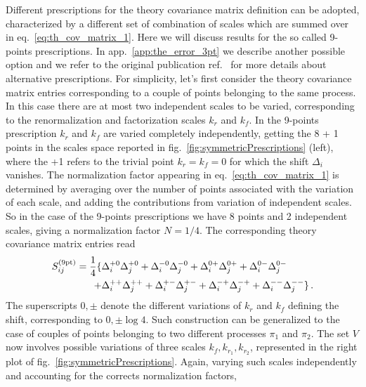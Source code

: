 %
Different prescriptions for the theory covariance matrix definition can be adopted, characterized by a different
set of combination of scales which are summed over in eq.~\eqref{eq:th_cov_matrix_1}.
Here we will discuss results for the so called 9-points prescriptions. In app.~\ref{app:the_error_3pt}
we describe another possible option and we refer to the original publication 
ref.~\cite{AbdulKhalek:2020jut} for more details about alternative prescriptions.
For simplicity, let's first consider the theory covariance matrix entries corresponding to 
a couple of points belonging to the same process. In this case there are at most two independent scales to be varied,
corresponding to the renormalization and factorization scales $k_r$ and $k_f$.
In the 9-points prescription $k_r$ and $k_f$ are varied completely independently, getting the 8 + 1 points in the 
scales space reported in fig.~\ref{fig:symmetricPrescriptions} (left), where the +1 refers to the trivial 
point $k_r=k_f=0$ for which the shift $\Delta_i$ vanishes.
The normalization factor appearing in eq.~\eqref{eq:th_cov_matrix_1}
is determined by averaging over the number of points associated with the variation of each scale,
and adding the contributions from variation of independent scales.
So in the case of the 9-points prescriptions we have 8 points and 2 independent scales, 
giving a normalization factor $N=1/4$. The corresponding theory covariance matrix entries read
\begin{equation}
    \label{9S}
    \begin{split}
        S^{(\rm 9pt)}_{ij} = \frac{1}{4}\{ &\Delta_i^{+0} \Delta_j^{+0} + \Delta_i^{-0}\Delta_j^{-0}
                                + \Delta_i^{0+} \Delta_j^{0+} + \Delta_i^{0-}\Delta_j^{0-} \\
                                + &\Delta_i^{++}\Delta_j^{++} + \Delta_i^{+-} \Delta_j^{+-}
                                + \Delta_i^{-+}\Delta_j^{-+} + \Delta_i^{--} \Delta_j^{--} \} \,.
    \end{split}                            
\end{equation}
The superscripts $0,\pm$ denote the different variations of $k_r$ and $k_f$ defining the shift,
corresponding to $ 0,\pm \log4$. 
Such construction can be generalized to the case of couples of
points belonging to two different processes $\pi_1$ and $\pi_2$. The set $V$ now involves 
possible variations of three scales $k_f,k_{r_1}, k_{r_2}$, represented in the right plot 
of fig.~\ref{fig:symmetricPrescriptions}.
Again, varying such scales independently and accounting for the corrects normalization factors,
